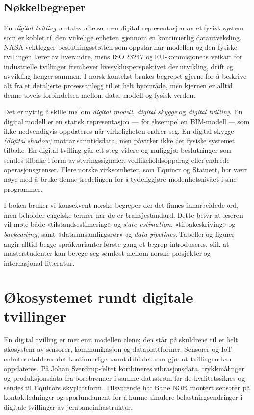\subsection{Nøkkelbegreper}
En \emph{digital tvilling} omtales ofte som en digital representasjon av et fysisk system som er koblet til den virkelige enheten gjennom en kontinuerlig datautveksling. NASA vektlegger beslutningsstøtten som oppstår når modellen og den fysiske tvillingen lærer av hverandre, mens ISO 23247 og EU-kommisjonens veikart for industrielle tvillinger fremhever livssyklusperspektivet der utvikling, drift og avvikling henger sammen. I norsk kontekst brukes begrepet gjerne for å beskrive alt fra et detaljerte prosessanlegg til et helt byområde, men kjernen er alltid denne toveis forbindelsen mellom data, modell og fysisk verden.

Det er nyttig å skille mellom \emph{digital modell}, \emph{digital skygge} og \emph{digital tvilling}. En digital modell er en statisk representasjon --- for eksempel en BIM-modell --- som ikke nødvendigvis oppdateres når virkeligheten endrer seg. En digital skygge \textit{(digital shadow)} mottar sanntidsdata, men påvirker ikke det fysiske systemet tilbake. En digital tvilling går ett steg videre og muliggjør beslutninger som sendes tilbake i form av styringssignaler, vedlikeholdsoppdrag eller endrede operasjonsgrenser. Flere norske virksomheter, som Equinor og Statnett, har vært nøye med å bruke denne tredelingen for å tydeliggjøre modenhetsnivået i sine programmer.

I boken bruker vi konsekvent norske begreper der det finnes innarbeidede ord, men beholder engelske termer når de er bransjestandard. Dette betyr at leseren vil møte både «tilstandsestimering» og \emph{state estimation}, «tilbakeskriving» og \emph{backcasting}, samt «datainnsamlingsrør» og \emph{data pipelines}. Tabeller og figurer angir alltid begge språkvarianter første gang et begrep introduseres, slik at masterstudenter kan bevege seg sømløst mellom norske prosjekter og internasjonal litteratur.

\section{Økosystemet rundt digitale tvillinger}
En digital tvilling er mer enn modellen alene; den står på skuldrene til et helt økosystem av sensorer, kommunikasjon og dataplattformer. Sensorer og IoT-enheter etablerer det kontinuerlige sanntidsbildet som gjør at tvillingen kan oppdateres. På Johan Sverdrup-feltet kombineres vibrasjonsdata, trykkmålinger og produksjonsdata fra borebrønner i samme datastrøm før de kvalitetssikres og sendes til Equinors skyplattform. Tilsvarende har Bane NOR montert sensorer på kontaktledninger og sporfundament for å kunne simulere belastningsendringer i digitale tvillinger av jernbaneinfrastruktur.

